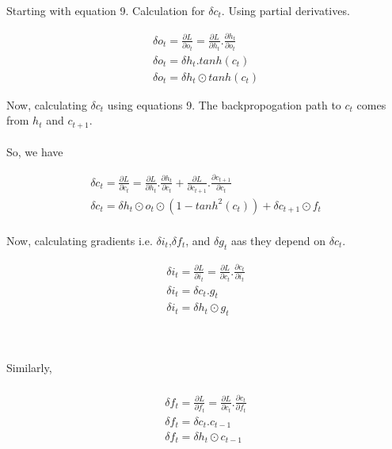 Starting with equation 9. Calculation for $ \delta c_{t} $. Using partial derivatives. 

\begin{equation}
    \begin{gathered}
    \delta o_t = \frac{\partial L}{\partial o_t} = \frac{\partial L}{\partial h_t} . \frac{\partial h_t}{\partial o_t}\\
    \delta o_t = \delta h_t . tanh(c_t)\\
    \delta o_t = \delta h_t \odot tanh(c_t)
    \end{gathered}
\end{equation}

Now, calculating $\delta c_t$ using equations 9. The backpropogation path to $c_t$ comes from $h_t$ and $c_{t+1}$. 
\\ \\ 
So, we have

\begin{equation}
    \begin{gathered}
        \delta c_t = \frac{\partial L}{\partial c_t} = \frac{\partial L}{\partial h_t}.\frac{\partial h_t}{\partial c_t} + \frac{\partial L}{\partial c_{t+1}}.\frac{\partial c_{t+1}}{\partial c_t}\\
        \delta c_t = \delta h_t \odot o_t \odot (1-tanh^2(c_t)) + \delta c_{t+1} \odot f_t\\
    \end{gathered}
\end{equation}

Now, calculating gradients i.e. $\delta i_t $,$\delta f_t $, and $\delta g_t $ aas they depend on $\delta c_t $.


\begin{equation}
    \begin{gathered}
    \delta i_t = \frac{\partial L}{\partial i_t} = \frac{\partial L}{\partial c_t} . \frac{\partial c_t}{\partial i_t}\\
    \delta i_t = \delta c_t . g_t\\
    \delta i_t = \delta h_t \odot g_t
    \end{gathered}
\end{equation}
    
\\ \\ 
Similarly, 
\\ \\

\begin{equation}
    \begin{gathered}
    \delta f_t = \frac{\partial L}{\partial f_t} = \frac{\partial L}{\partial c_t} . \frac{\partial c_t}{\partial f_t}\\
    \delta f_t = \delta c_t . c_{t-1}\\
    \delta f_t = \delta h_t \odot c_{t-1}
    \end{gathered}
\end{equation}

